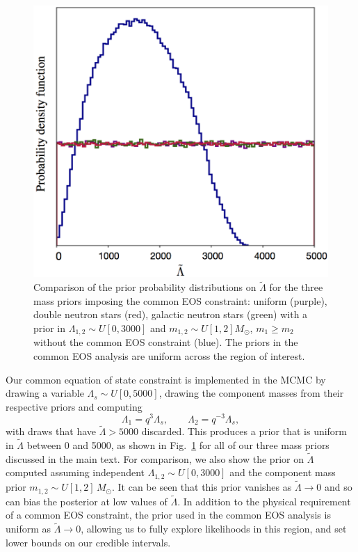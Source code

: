 \begin{figure}[t]
\includegraphics[width=\textwidth]{Figures/common-radius/prior_lambdatilde.png}
\caption{Comparison of the prior probability distributions on $\tilde\Lambda$ for the three mass priors imposing the common EOS constraint: uniform (purple), double neutron stars (red), galactic neutron stars (green) with a prior in $\Lambda_{1,2} \sim U[0, 3000]$ and $m_{1,2} \sim U[1, 2] M_\odot$, $m_1 \geq m_2$ without the common EOS constraint (blue). The priors in the common EOS analysis are uniform across the region of interest.} 
\label{fig:lambda_priors}
\end{figure}


Our common equation of state constraint is implemented in the MCMC by drawing a variable $\Lambda_s \sim U[0,5000]$, drawing the component masses from their respective priors and computing
\begin{equation}
\Lambda_1=q^3\Lambda_s,\qquad\Lambda_2=q^{-3}\Lambda_s,
\label{eq:lambdas_supp}\end{equation}
with draws that have $\tilde\Lambda > 5000$ discarded. This produces a prior that is uniform in $\tilde\Lambda$ between 0 and 5000, as shown in Fig.~\ref{fig:lambda_priors} for all of our three mass priors discussed in the main text. For comparison, we also show the prior on $\tilde\Lambda$ computed assuming independent $\Lambda_{1,2} \sim U[0,3000]$ and the component mass prior $m_{1,2}\sim U[1,2]\,M_\odot$. It can be seen that this prior vanishes as $\tilde\Lambda \rightarrow 0$ and so can bias the posterior at low values of   $\tilde\Lambda$. In addition to the physical requirement of a common EOS constraint, the prior used in the common EOS analysis is uniform as $\tilde\Lambda \rightarrow 0$, allowing us to fully explore likelihoods in this region, and set lower bounds on our credible intervals.

